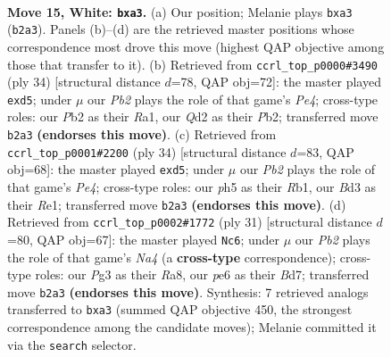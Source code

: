 \documentclass[11pt]{article}
\begin{document}
\clearpage

\begin{figure}[p]\centering
\begin{subfigure}{0.46\textwidth}\centering
\resizebox{\linewidth}{!}{%
\newchessgame
\chessboard[
  setfen={rnbq1rk1/5p2/1p2pnp1/3p3p/3P4/p1NB1NP1/PPPQ1PP1/2R1RK2 w - - 0 15},
  showmover=false,
  pgfstyle=straightmove, color=movearrow, markmove={b2-a3}
]}
\caption{}
\end{subfigure}\hfill
\begin{subfigure}{0.46\textwidth}\centering
\resizebox{\linewidth}{!}{%
\newchessgame
\chessboard[
  setfen={rr4k1/2pqb1p1/p3pn1p/3p4/pn1PP3/2N1BN1P/1P2QPP1/R3R1K1 w - - 0 18},
  showmover=false,
  pgfstyle=straightmove, color=movearrow, markmove={e4-d5}
]}
\caption{}
\end{subfigure}
\\[4pt]
\begin{subfigure}{0.46\textwidth}\centering
\resizebox{\linewidth}{!}{%
\newchessgame
\chessboard[
  setfen={r1bqr1k1/5pp1/2p2nnp/p2pp3/P3P3/2PPNN2/B4PPP/1R1QR1K1 w - - 0 18},
  showmover=false,
  pgfstyle=straightmove, color=movearrow, markmove={e4-d5}
]}
\caption{}
\end{subfigure}\hfill
\begin{subfigure}{0.46\textwidth}\centering
\resizebox{\linewidth}{!}{%
\newchessgame
\chessboard[
  setfen={r4rk1/3bqpp1/3p1n1p/np2p3/2p1P3/3P1N1P/1PP2PP1/RBBQR1K1 b - - 1 16},
  showmover=false,
  pgfstyle=straightmove, color=movearrow, markmove={a5-c6}
]}
\caption{}
\end{subfigure}
\caption{\textbf{Move 15, White: \texttt{bxa3}.} (a) Our position; Melanie plays \texttt{bxa3} (\texttt{b2a3}). Panels (b)--(d) are the retrieved master positions whose correspondence most drove this move (highest QAP objective among those that transfer to it). (b) Retrieved from \texttt{ccrl\_top\_p0000\#3490} (ply 34) [structural distance $d$=78, QAP obj=72]: the master played \texttt{exd5}; under $\mu$ our \emph{Pb2} plays the role of that game's \emph{Pe4}; cross-type roles: our \emph{P}b2 as their \emph{R}a1, our \emph{Q}d2 as their \emph{P}b2; transferred move \texttt{b2a3} \textbf{(endorses this move)}. (c) Retrieved from \texttt{ccrl\_top\_p0001\#2200} (ply 34) [structural distance $d$=83, QAP obj=68]: the master played \texttt{exd5}; under $\mu$ our \emph{Pb2} plays the role of that game's \emph{Pe4}; cross-type roles: our \emph{p}h5 as their \emph{R}b1, our \emph{B}d3 as their \emph{R}e1; transferred move \texttt{b2a3} \textbf{(endorses this move)}. (d) Retrieved from \texttt{ccrl\_top\_p0002\#1772} (ply 31) [structural distance $d$=80, QAP obj=67]: the master played \texttt{Nc6}; under $\mu$ our \emph{Pb2} plays the role of that game's \emph{Na4} (a \textbf{cross-type} correspondence); cross-type roles: our \emph{P}g3 as their \emph{R}a8, our \emph{p}e6 as their \emph{B}d7; transferred move \texttt{b2a3} \textbf{(endorses this move)}. Synthesis: 7 retrieved analogs transferred to \texttt{bxa3} (summed QAP objective 450, the strongest correspondence among the candidate moves); Melanie committed it via the \texttt{search} selector.}
\label{fig:thought-m28}
\end{figure}
\end{document}
